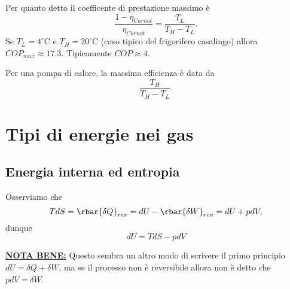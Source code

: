 \begin{remark}
Per quanto detto il coefficente di prestazione massimo \`e
\[\frac{1-\eta_{Carnot}}{\eta_{Carnot}}= \frac{T_L}{T_H-T_L}.\]
Se $T_L=4^\circ\mathrm{C}$ e $T_H=20^\circ\mathrm{C}$ (caso tipico del frigorifero casalingo) allora $COP_{max}\approx 17.3$. Tipicamente $COP\approx 4$.
\end{remark}
\begin{remark}
Per una pompa di calore, la massima efficienza \`e data da
\[\frac{T_H}{T_H-T_L}.\]
\end{remark}


\section{Tipi di energie nei gas}
\subsection{Energia interna ed entropia}

\begin{remark}[Differenziali]
Osserviamo che
\[TdS=\rbar{\delta Q}_{rev}=dU-\rbar{\delta W}_{rev}=dU+pdV,\]
dunque
\[\boxed{dU=TdS-pdV}\]
\end{remark}
\begin{remark}
\underline{\textbf{NOTA BENE:}} Questo sembra un altro modo di scrivere il primo principio $dU=\delta Q+\delta W$, ma se il processo non \`e reversibile allora non \`e detto che $pdV=\delta W$.
\end{remark}

